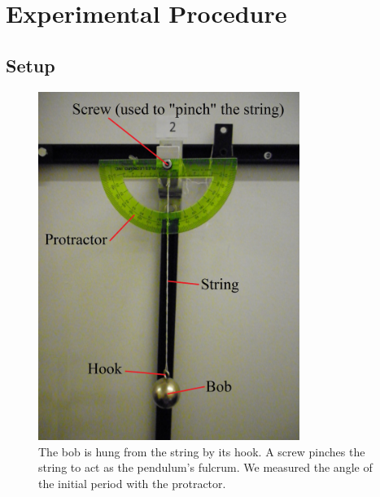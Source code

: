 \documentclass[iop]{emulateapj}
\begin{document}
\section{Experimental Procedure}
\label{sec:procedure}

\subsection{Setup}



\begin{figure}[H]
\centering
\includegraphics[width=85mm]{../../Images/Pendulum.JPG}
\caption{The bob is hung from the string by its hook. A screw pinches the string to act as
the pendulum's fulcrum. We measured the angle of the initial period with the 
protractor.}
\label{Pendulum}
\end{figure}


\end{document}
